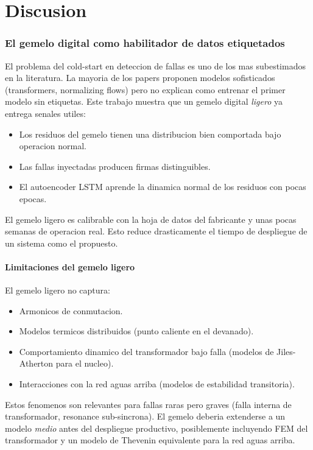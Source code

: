 \chapter{Discusion}

\subsection{El gemelo digital como habilitador de datos etiquetados}

El problema del cold-start en deteccion de fallas es uno de los mas
subestimados en la literatura. La mayoria de los papers proponen
modelos sofisticados (transformers, normalizing flows) pero no
explican como entrenar el primer modelo sin etiquetas. Este trabajo
muestra que un gemelo digital \emph{ligero} ya entrega senales utiles:

\begin{itemize}[leftmargin=*,itemsep=2pt]
  \item Los residuos del gemelo tienen una distribucion bien
        comportada bajo operacion normal.
  \item Las fallas inyectadas producen firmas distinguibles.
  \item El autoencoder LSTM aprende la dinamica normal de los
        residuos con pocas epocas.
\end{itemize}

El gemelo ligero es calibrable con la hoja de datos del fabricante
y unas pocas semanas de operacion real. Esto reduce drasticamente el
tiempo de despliegue de un sistema como el propuesto.

\subsubsection{Limitaciones del gemelo ligero}

El gemelo ligero no captura:
\begin{itemize}[leftmargin=*,itemsep=2pt]
  \item Armonicos de conmutacion.
  \item Modelos termicos distribuidos (punto caliente en el
        devanado).
  \item Comportamiento dinamico del transformador bajo falla
        (modelos de Jiles-Atherton para el nucleo).
  \item Interacciones con la red aguas arriba (modelos de estabilidad
        transitoria).
\end{itemize}

Estos fenomenos son relevantes para fallas raras pero graves (falla
interna de transformador, resonance sub-sincrona). El gemelo deberia
extenderse a un modelo \emph{medio} antes del despliegue
productivo, posiblemente incluyendo FEM del transformador y un
modelo de Thevenin equivalente para la red aguas arriba.

